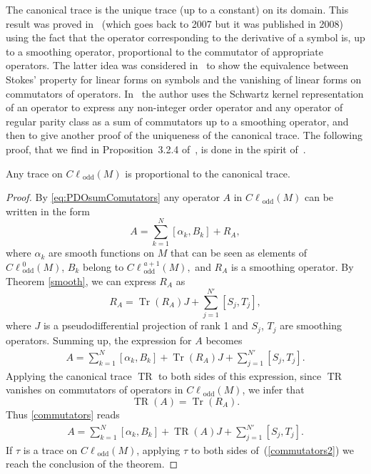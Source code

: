 \documentclass[pdftex]{sigma}
\DeclareMathOperator{\TR}{TR} \DeclareMathOperator{\Op}{Op}
\DeclareMathOperator{\Tr}{Tr} \DeclareMathOperator{\ord}{ord}
\DeclareMathOperator{\odd}{odd} \DeclareMathOperator{\supp}{supp}
\def \Cl {{C\ell}}
\begin{document}
The canonical trace is the unique trace (up to a constant) on its domain. This result was proved in~\cite{maniccia} (which goes back to 2007 but it was published in 2008) using the fact that the operator corresponding to the derivative of a symbol is, up to a smoothing operator, proportional to the commutator of appropriate operators. The latter idea was considered in~\cite{sylvie} to show the equivalence between Stokes' property for linear forms on symbols and the vanishing of linear forms on commutators of operators. In~\cite{ponge} the author uses the Schwartz kernel representation of an operator to express any non-integer order operator and any operator of regular parity class as a sum of commutators up to a smoothing operator, and then to give another proof of the uniqueness of the canonical trace. The following proof, that we f\/ind in Proposition~3.2.4 of~\cite{ouedraogothese}, is done in the spirit of~\cite{maniccia}.

\begin{theorem}\label{prop:UniquenessTrace}
Any trace on $\Cl_{\odd}(M)$ is proportional to the canonical trace.
\end{theorem}

\begin{proof}
By \eqref{eq:PDOsumComutators} any operator $A$ in $\Cl_{\odd}(M)$ can be written in the form
\[
A=\sum\limits_{k=1}^{N}[\alpha_k,B_k]+R_A,
\]
where $\alpha_k$ are smooth functions on $M$ that can be seen as elements of $\Cl^0_{\odd}(M)$, $B_k$ belong to $\Cl^{a+1}_{\odd}(M),$ and $R_A$ is a smoothing operator.
By Theorem \ref{smooth}, we can express $R_A$ as
\[
R_A=\Tr(R_A)J+\sum_{j=1}^{N'}[S_j,T_j],
\]
where $J$ is a pseudodif\/ferential projection of rank 1 and $S_j$, $T_j$ are smoothing operators. Summing up, the expression for $A$ becomes
\begin{gather}
A=\sum\limits_{k=1}^{N}[\alpha_k,B_k]+\Tr(R_A)J+\sum_{j=1}^{N'}[S_j,T_j]. \label{commutators}
\end{gather}
Applying the canonical trace $\TR$ to both sides of this expression, since $\TR$ vanishes on commutators of operators in $\Cl_{\odd}(M)$, we infer that
\[
\TR(A)=\Tr(R_A).
\]
Thus \eqref{commutators} reads
\begin{gather}
A=\sum\limits_{k=1}^{N}[\alpha_k,B_k]+\TR(A)J+\sum_{j=1}^{N'}[S_j,T_j]. \label{commutators2}
\end{gather}
If $\tau$ is a trace on $\Cl_{\odd}(M)$, applying $\tau$ to both sides of~(\ref{commutators2}) we reach the conclusion of the theorem.
\end{proof}
\end{document}
